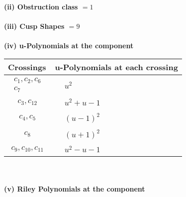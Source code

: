 \documentclass[1p]{elsarticle_modified}
\theoremstyle{definition}
\begin{document}
\flushleft \textbf{(ii) Obstruction class $= 1$}\\~\\
\flushleft \textbf{(iii) Cusp Shapes $= 9$}\\~\\
\newpage\renewcommand{\arraystretch}{1}
\flushleft \textbf{(iv) u-Polynomials at the component}\newline \\
\begin{tabular}{m{50pt}|m{274pt}}
Crossings & \hspace{64pt}u-Polynomials at each crossing \\
\hline $$\begin{aligned}c_{1},c_{2},c_{6}\\c_{7}\end{aligned}$$&$\begin{aligned}
&u^2
\end{aligned}$\\
\hline $$\begin{aligned}c_{3},c_{12}\end{aligned}$$&$\begin{aligned}
&u^2+u-1
\end{aligned}$\\
\hline $$\begin{aligned}c_{4},c_{5}\end{aligned}$$&$\begin{aligned}
&(u-1)^2
\end{aligned}$\\
\hline $$\begin{aligned}c_{8}\end{aligned}$$&$\begin{aligned}
&(u+1)^2
\end{aligned}$\\
\hline $$\begin{aligned}c_{9},c_{10},c_{11}\end{aligned}$$&$\begin{aligned}
&u^2- u-1
\end{aligned}$\\
\hline
\end{tabular}\\~\\
\newpage\renewcommand{\arraystretch}{1}
\flushleft \textbf{(v) Riley Polynomials at the component}\newline \\
\end{document}

